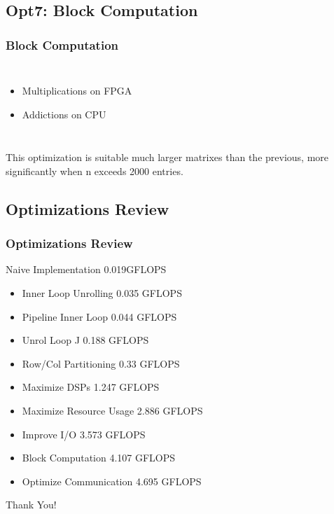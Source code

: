 \documentclass{beamer}
\begin{document}
\begin{frame}
\subsection{Opt7: Block Computation}
\frametitle{Block Computation}

\begin{columns}[c]



\begin{itemize}
\item Multiplications on FPGA
\item Addictions on CPU
\end{itemize}
\end{columns}

This optimization is suitable much larger matrixes than the previous, more significantly when n exceeds 2000 entries.

\end{frame}
\begin{frame}
\subsection{Optimizations Review}
\frametitle{Optimizations Review}
Naive Implementation 0.019GFLOPS
\begin{itemize}
\item Inner Loop Unrolling 0.035 GFLOPS
\item Pipeline Inner Loop 0.044 GFLOPS
\item Unrol Loop J 0.188 GFLOPS
\item Row/Col Partitioning 0.33 GFLOPS
\item Maximize DSPs 1.247 GFLOPS
\item Maximize Resource Usage 2.886 GFLOPS
\item Improve I/O 3.573 GFLOPS
\item Block Computation 4.107 GFLOPS
\item Optimize Communication 4.695 GFLOPS
\end{itemize}
\end{frame}
\begin{frame}
Thank You!

\end{frame}
\end{document}
